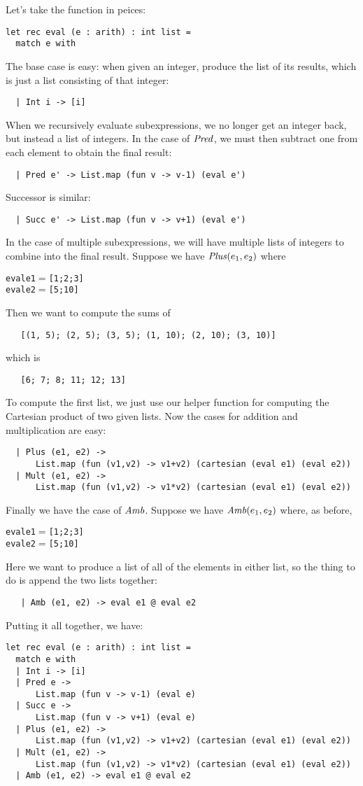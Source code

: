 Let's take the function in peices:
\begin{verbatim}
let rec eval (e : arith) : int list =
  match e with
\end{verbatim}
The base case is easy: when given an integer, produce the list of its
results, which is just a list consisting of that integer:
\begin{verbatim}
  | Int i -> [i]
\end{verbatim}
When we recursively evaluate subexpressions, we no longer get an
integer back, but instead a list of integers.  In the case of $\mathit{Pred}$,
we must then subtract one from each element to obtain the final result:
\begin{verbatim}
  | Pred e' -> List.map (fun v -> v-1) (eval e')
\end{verbatim}
Successor is similar:
\begin{verbatim}
  | Succ e' -> List.map (fun v -> v+1) (eval e')
\end{verbatim}
In the case of multiple subexpressions, we will have multiple lists of
integers to combine into the final result.  Suppose we have
$\mathit{Plus}(e_1,e_2)$ where
\begin{alltt}
   eval e1 \(=\) [1; 2; 3]
   eval e2 \(=\) [5; 10]
\end{alltt}
Then we want to compute the sums of
\begin{verbatim}
   [(1, 5); (2, 5); (3, 5); (1, 10); (2, 10); (3, 10)]
\end{verbatim}
which is
\begin{verbatim}
   [6; 7; 8; 11; 12; 13]
\end{verbatim}
To compute the first list, we just use our helper function for computing
the Cartesian product of two given lists.
%
Now the cases for addition and multiplication are easy:
\begin{verbatim}
  | Plus (e1, e2) -> 
      List.map (fun (v1,v2) -> v1+v2) (cartesian (eval e1) (eval e2))
  | Mult (e1, e2) -> 
      List.map (fun (v1,v2) -> v1*v2) (cartesian (eval e1) (eval e2))
\end{verbatim}
Finally we have the case of $\mathit{Amb}$.  Suppose we have $\mathit{Amb}(e_1,e_2)$ where,
as before,
\begin{alltt}
   eval e1 \(=\) [1; 2; 3]
   eval e2 \(=\) [5; 10]
\end{alltt}
Here we want to produce a list of all of the elements in either list,
so the thing to do is append the two lists together:
\begin{verbatim}
   | Amb (e1, e2) -> eval e1 @ eval e2
\end{verbatim}
Putting it all together, we have:
\begin{verbatim}
let rec eval (e : arith) : int list =
  match e with
  | Int i -> [i]
  | Pred e -> 
      List.map (fun v -> v-1) (eval e)
  | Succ e ->
      List.map (fun v -> v+1) (eval e)
  | Plus (e1, e2) -> 
      List.map (fun (v1,v2) -> v1+v2) (cartesian (eval e1) (eval e2))
  | Mult (e1, e2) ->
      List.map (fun (v1,v2) -> v1*v2) (cartesian (eval e1) (eval e2))
  | Amb (e1, e2) -> eval e1 @ eval e2
\end{verbatim}


